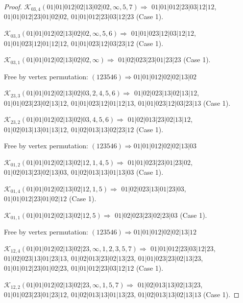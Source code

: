 \documentclass[12pt]{article}
\theoremstyle{plain}
\theoremstyle{definition}
\theoremstyle{remark}
\newcommand{\fancy}[1]{\mathcal{#1}}
\def\K{\fancy{K}}
\begin{document}
\begin{proof}
	$\K_{03,4}(01|01|012|02|13|02|02,\infty,5, 7)\Rightarrow $ $01|01|012|23|03|12|12$, $01|01|012|23|01|02|02$, $01|01|012|23|03|12|23$ (Case 1).
	
	$\K_{03,3}(01|01|012|02|13|02|02,\infty,5, 6)\Rightarrow $ $01|01|023|12|03|12|12$, $01|01|023|12|01|12|12$, $01|01|023|12|03|23|12$ (Case 1).
	
	$\K_{03,1}(01|01|012|02|13|02|02,\infty)\Rightarrow $ $01|02|023|23|01|23|23$ (Case 1).
	
	
	
	Free by vertex permutation: $(1 2 3 5 4 6)\Rightarrow 01|01|012|02|02|13|02$
	
	
	
	\bigskip
	
	$\K_{23,3}(01|01|012|02|13|02|03,2, 4, 5, 6)\Rightarrow $ $01|02|023|13|02|13|12$, $01|01|023|23|02|13|12$, $01|01|023|12|01|12|13$, $01|01|023|12|03|23|13$ (Case 1).
	
	$\K_{23,2}(01|01|012|02|13|02|03,4, 5, 6)\Rightarrow $ $01|02|013|23|02|13|12$, $01|02|013|13|01|13|12$, $01|02|013|13|02|23|12$ (Case 1).
	
	
	
	Free by vertex permutation: $(1 2 3 5 4 6)\Rightarrow 01|01|012|02|02|13|03$
	
	
	
	\bigskip
	
	$\K_{01,2}(01|01|012|02|13|02|12,1, 4, 5)\Rightarrow $ $01|01|023|23|01|23|02$, $01|02|013|23|02|13|03$, $01|02|013|13|01|13|03$ (Case 1).
	
	$\K_{01,4}(01|01|012|02|13|02|12,1, 5)\Rightarrow $ $01|02|023|13|01|23|03$, $01|01|012|23|01|02|12$ (Case 1).
	
	$\K_{01,1}(01|01|012|02|13|02|12,5)\Rightarrow $ $01|02|023|23|02|23|03$ (Case 1).
	
	
	
	Free by vertex permutation: $(1 2 3 5 4 6)\Rightarrow 01|01|012|02|02|13|12$
	
	
	
	\bigskip
	
	$\K_{12,4}(01|01|012|02|13|02|23,\infty,1, 2, 3, 5, 7)\Rightarrow $ $01|01|012|23|03|12|23$, $01|02|023|13|01|23|13$, $01|02|013|23|02|13|23$, $01|01|023|23|02|13|23$, $01|01|012|23|01|02|23$, $01|01|012|23|03|12|12$ (Case 1).
	
	$\K_{12,2}(01|01|012|02|13|02|23,\infty,1, 5, 7)\Rightarrow $ $01|02|013|13|02|13|23$, $01|01|023|23|01|23|12$, $01|02|013|13|01|13|23$, $01|02|013|13|02|13|13$ (Case 1).
	

\end{proof}
\end{document}
